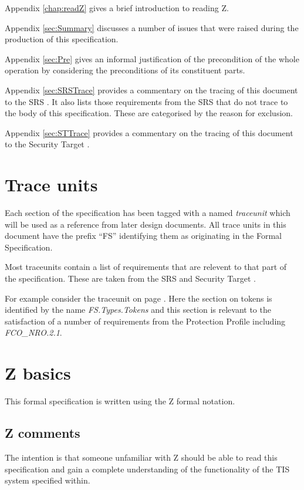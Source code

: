 Appendix \ref{chap:readZ} gives a brief introduction to reading Z. 

Appendix \ref{sec:Summary} discusses a number of issues that were raised during the
production of this specification.

Appendix \ref{sec:Pre} gives an informal justification of the
precondition of the whole operation by considering the preconditions
of its constituent parts.

Appendix \ref{sec:SRSTrace} provides a commentary on the tracing of
this document to the SRS \cite{SRS}. It also lists those requirements
from the SRS that do not
trace to the body of this specification. These are categorised by the
reason for exclusion.

Appendix \ref{sec:STTrace} provides a commentary on the tracing of
this document to the Security Target \cite{ST}. 

\section{Trace units}
\label{sec:Traceunit}
Each section of the specification has been tagged with a named {\em
traceunit} which will be used as a reference from later design
documents. All trace units in this document have the prefix ``FS''
identifying them as originating in the Formal Specification.

Most traceunits contain a list of requirements that are relevent to
that part of the specification. These are taken from the SRS
\cite{SRS} and Security Target \cite{ST}. 

For example consider the traceunit on page \pageref{page:firstTraceunit}. Here
the section on tokens is identified by the name {\em FS.Types.Tokens}
and this section is relevant to the satisfaction of a number of
requirements from the Protection Profile \cite{PP} including {\it
FCO\_NRO.2.1}.  
\section{Z basics}
This formal specification is written using the Z formal notation. \cite{Spivey}

\subsection{Z comments}
The intention is that someone unfamiliar with Z should be able to read this
specification and gain a complete understanding of the functionality
of the TIS system specified within.

